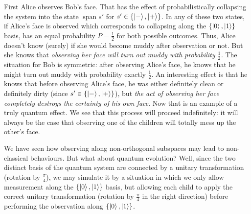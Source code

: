 \documentclass[a4paper]{article}
\DeclareMathOperator{\spn}{span}
\begin{document}
First Alice observes Bob's face. That has the effect of probabilistically
collapsing the system into the state $\spn s'$ for $s' \in \{\ket{-},\ket{+}\}$.
In any of these two states, if Alice's face is observed which corresponds to
collapsing along the $\{\ket{0},\ket{1}\}$ basis, has an equal probability $P =
\frac{1}{2}$ for both possible outcomes.  Thus, Alice doesn't know (surely) if
she would become muddy after observation or not. But she knows that
\emph{observing her face will turn out muddy with probability $\frac{1}{2}$.}
The situation for Bob is symmetric: after observing Alice's face, he knows that
he might turn out muddy with probability exactly $\frac{1}{2}$. An interesting
effect is that he knows that before observing Alice's face, he was either
definitely clean or definitely dirty (since $s' \in \{\ket{-}, \ket{+}\}$), but
\emph{the act of observing her face completely destroys the certainty of his own
face}.  Now that is an example of a truly quantum effect. We see that this
process will proceed indefinitely: it will always be the case that observing one
of the children will totally mess up the other's face.

We have seen how observing along non-orthogonal subspaces may lead to
non-classical behaviours. But what about quantum evolution? Well, since the two
distinct basis of the quantum system are connected by a unitary transformation
(rotation by $\frac{\pi}{4}$), we may simulate it by a situation in which we
only allow measurement along the $\{\ket{0},\ket{1}\}$ basis, but allowing each
child to apply the correct unitary transformation (rotation by $\frac{\pi}{4}$
in the right direction) before performing the observation along
$\{\ket{0},\ket{1}\}$.
\end{document}
